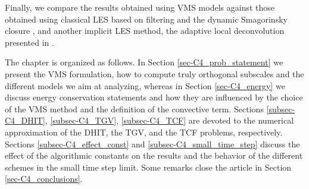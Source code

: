 Finally, we compare the results obtained using VMS models against those obtained using classical LES based on filtering and the dynamic Smagorinsky closure \cite{fauconnier_construction_2009}, and another implicit LES method, the adaptive local deconvolution presented in \cite{hickel_adaptive_2006}. 

The chapter is organized as follows. In Section \ref{sec-C4_prob_statement} we present the VMS formulation, how to compute truly orthogonal subscales and the different models we aim at analyzing, whereas in Section \ref{sec-C4_energy} we discuss energy conservation statements and how they are influenced by the choice of the VMS method and the definition of the convective term. Sections \ref{subsec-C4_DHIT},  \ref{subsec-C4_TGV},  \ref{subsec-C4_TCF} are devoted to the numerical approximation of the DHIT, the TGV, and the TCF problems, respectively. Sections \ref{subsec-C4_effect_const} and \ref{subsec-C4_small_time_step} discuss the effect of the algorithmic constants on the results and the behavior of the different schemes in the small time step limit. Some remarks close the article in Section \ref{sec-C4_conclusions}.



